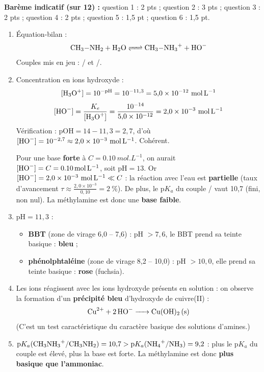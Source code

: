 \documentclass[11pt]{article}
\begin{document}
\begin{corrige}
\textbf{Barème indicatif (sur 12) :} question 1 : 2 pts ; question 2 : 3 pts ; question 3 : 2 pts ; question 4 : 2 pts ; question 5 : 1,5 pt ; question 6 : 1,5 pt.

\begin{enumerate}
\item Équation-bilan :
\[ \ce{CH3-NH2 + H2O <=> CH3-NH3+ + HO-} \]
Couples mis en jeu : / et /.
\item Concentration en ions hydroxyde :
\[ [\ce{H3O+}] = 10^{-\text{pH}} = 10^{-11{,}3} = 5{,}0 \times 10^{-12}\ \si{mol.L^{-1}} \]
\[ [\ce{HO-}] = \frac{K_e}{[\ce{H3O+}]} = \frac{10^{-14}}{5{,}0 \times 10^{-12}} = 2{,}0 \times 10^{-3}\ \si{mol.L^{-1}} \]
Vérification : $\text{pOH} = 14 - 11{,}3 = 2{,}7$, d'où $[\ce{HO-}] = 10^{-2{,}7} \approx 2{,}0 \times 10^{-3}\ \si{mol.L^{-1}}$. Cohérent.

Pour une base \textbf{forte} à $C = \SI{0,10}{mol.L^{-1}}$, on aurait $[\ce{HO-}] = C = \SI{0,10}{mol.L^{-1}}$, soit $\text{pH} = 13$. Or $[\ce{HO-}] = 2{,}0 \times 10^{-3}\ \si{mol.L^{-1}} \ll C$ : la réaction avec l'eau est \textbf{partielle} (taux d'avancement $\tau \approx \frac{2{,}0 \times 10^{-3}}{0{,}10} = 2\ \%$). De plus, le $\text{p}K_a$ du couple / vaut 10,7 (fini, non nul). La méthylamine est donc une \textbf{base faible}.
\item $\text{pH} = 11{,}3$ :
\begin{itemize}
\item \textbf{BBT} (zone de virage 6,0 -- 7,6) : pH $> 7{,}6$, le BBT prend sa teinte basique : \textbf{bleu} ;
\item \textbf{phénolphtaléine} (zone de virage 8,2 -- 10,0) : pH $> 10{,}0$, elle prend sa teinte basique : \textbf{rose} (fuchsia).
\end{itemize}
\item Les ions  réagissent avec les ions hydroxyde présents en solution : on observe la formation d'un \textbf{précipité bleu} d'hydroxyde de cuivre(II) :
\[ \ce{Cu^2+ + 2HO- -> Cu(OH)2 (s)} \]
(C'est un test caractéristique du caractère basique des solutions d'amines.)
\item $\text{p}K_a(\ce{CH3NH3+}/\ce{CH3NH2}) = 10{,}7 > \text{p}K_a(\ce{NH4+}/\ce{NH3}) = 9{,}2$ : plus le $\text{p}K_a$ du couple est élevé, plus la base est forte. La méthylamine est donc \textbf{plus basique que l'ammoniac}.


\end{enumerate}
\end{corrige}
\end{document}
